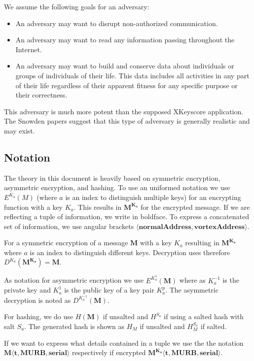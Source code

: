 \documentclass[10pt,journal,compsoc]{IEEEtran}
\begin{document}
We assume the following goals for an adversary:
\begin{itemize}
	\item An adversary may want to disrupt non-authorized communication.
	\item An adversary may want to read any information passing throughout the Internet.
	\item An adversary may want to build and conserve data about individuals or groups of individuals of their life. This data includes all activities in any part of their life regardless of their apparent fitness for any specific purpose or their correctness.
\end{itemize}

This adversary is much more potent than the supposed XKeyscore application. The Snowden papers suggest that this type of adversary is generally realistic and may exist.

\subsection{Notation \label{sec:encNot}}
The theory in this document is heavily based on symmetric encryption, asymmetric encryption, and hashing. To use an uniformed notation we use $E^{K_a}(M)$ (where $a$ is an index to distinguish multiple keys) for an encrypting function with a key $K_a$. This results in $\mathbf{M^{K_a}}$ for the encrypted message. If we are reflecting a tuple of information, we write in boldface. To express a concatenated set of information, we use angular brackets $\mathbf{\langle normalAddress,vortexAddress\rangle }$. 

For a symmetric encryption of a message $\mathbf{M}$ with a key $K_a$ resulting in $\mathbf{M^{K_a}}$ where $a$ is an index to distinguish different keys. Decryption uses therefore $D^{K_a}(\mathbf{M^{K_a}})=\mathbf{M}$.

As notation for asymmetric encryption we use $E^{K^{1}_a}(\mathbf{M})$ where as $K^{-1}_a$ is the private key and $K^{1}_a$ is the public key of a key pair $K^p_a$. The asymmetric decryption is noted as $D^{K^{-1}_a}(\mathbf{M})$.

For hashing, we do use $H(\mathbf{M})$ if unsalted and $H^{S_a}$ if using a salted hash with salt $S_a$. The generated hash is shown as $H_M$ if unsalted and $H^{S_a}_M$ if salted.

If we want to express what details contained in a tuple we use the the notation $\mathbf{M\langle t,MURB,serial\rangle }$ respectively if encrypted $\mathbf{M^{K_{a}}\langle t,MURB,serial\rangle}$.
\end{document}
